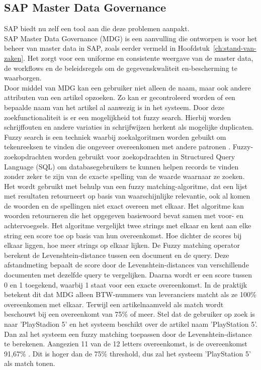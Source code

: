 \subsection{SAP Master Data Governance}
SAP biedt nu zelf een tool aan die deze problemen aanpakt. 
\\SAP Master Data Governance (MDG) is een aanvulling die ontworpen is voor het beheer van master data in SAP, zoals eerder vermeld in Hoofdstuk~\ref{ch:stand-van-zaken}. Het zorgt voor een uniforme en consistente weergave van de master data, de workflows en de beleidsregels om de gegevenskwaliteit en-bescherming te waarborgen. 
\\Door middel van MDG kan een gebruiker niet alleen de naam, maar ook andere attributen van een artikel opzoeken. Zo kan er gecontroleerd worden of een bepaalde naam van het artikel al aanwezig is in het systeem. Door deze zoekfunctionaliteit is er een mogelijkheid tot fuzzy search. Hierbij worden schrijffouten en andere variaties in schrijfwijzen herkent als mogelijke duplicaten. 
\\Fuzzy search is een techniek waarbij zoekalgoritmen worden gebuikt om tekenreeksen te vinden die ongeveer overeenkomen met andere patronen \autocite{TechTarget2022}. Fuzzy-zoekopdrachten worden gebruikt voor zoekopdrachten in Structured Query Language (SQL) om databasegebruikers te kunnen helpen records te vinden zonder zeker te zijn van de exacte spelling van de waarde waarnaar ze zoeken. Het wordt gebruikt met behulp van een fuzzy matching-algoritme, dat een lijst met resultaten retourneert op basis van waarschijnlijke relevantie, ook al komen de woorden en de spellingen niet exact overeen met elkaar. Het algoritme kan woorden retourneren die het opgegeven basiswoord bevat samen met voor- en achtervoegsels. Het algoritme vergelijkt twee strings met elkaar en kent aan elke string een score toe op basis van hun overeenkomst. Hoe dichter de scores bij elkaar liggen, hoe meer strings op elkaar lijken. De Fuzzy matching operator berekent de Levenshtein-distance tussen een document en de query. Deze afstandmeting bepaalt de score door de Levenshtein-distances van verschillende documenten met dezelfde query te vergelijken. Daarna wordt er een score tussen 0 en 1 toegekend, waarbij 1 staat voor een exacte overeenkomst. In de praktijk betekent dit dat MDG alleen BTW-nummers van leveranciers matcht als ze 100\% overeenkomen met elkaar. Terwijl een artikelnaamveld als match wordt beschouwt bij een overeenkomt van 75\% of meer. Stel dat de gebruiker op zoek is naar 'PlayStadion 5' en het systeem beschikt over de artikel naam 'PlayStation 5'. Dan zal het systeem een fuzzy matching toepassen door de Levenshtein-distance te berekenen. Aangezien 11 van de 12 letters overeenkomst, is de overeenkomst 91,67\% \autocite{IBM}. Dit is hoger dan de 75\% threshold, dus zal het systeem 'PlayStation 5' als match tonen.
